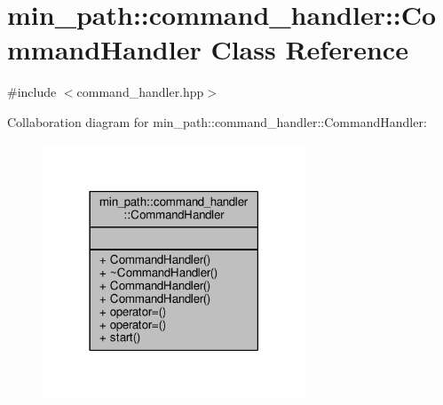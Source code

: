 \hypertarget{a00003}{}\section{min\+\_\+path\+:\+:command\+\_\+handler\+:\+:Command\+Handler Class Reference}
\label{a00003}


{\ttfamily \#include $<$command\+\_\+handler.\+hpp$>$}



Collaboration diagram for min\+\_\+path\+:\+:command\+\_\+handler\+:\+:Command\+Handler\+:
\nopagebreak
\begin{figure}[H]
\begin{center}
\leavevmode
\includegraphics[width=222pt]{d2/db1/a00070}
\end{center}
\end{figure}
